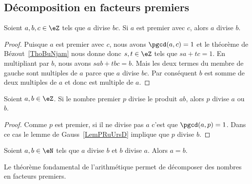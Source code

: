 \subsection{Décomposition en facteurs premiers}

\begin{lemma}    \label{LemPRuUrsD}
	Soient \( a,b,c\in \eZ\) tels que \( a\) divise \( bc\). Si \( a\) est premier avec \( c\), alors \( a\) divise \( b\).
\end{lemma}

\begin{proof}
	Puisque \( a\) est premier avec \( c\), nous avons \( \pgcd(a,c)=1\) et le théorème de Bézout~\ref{ThoBuNjam} nous donne donc \( s,t\in \eZ\) tels que \( sa+tc=1\). En multipliant par \( b\), nous avons \( sab+tbc=b\). Mais les deux termes du membre de gauche sont multiples de \( a\) parce que \( a\) divise \( bc\). Par conséquent \( b\) est somme de deux multiples de \( a\) et donc est multiple de \( a\).
\end{proof}

\begin{lemma}       \label{LemAXINooOeuMJZ}
	Soient \( a,b\in \eZ\). Si le nombre premier \( p\) divise le produit \( ab\), alors \( p\) divise \( a\) ou \( b\).
\end{lemma}

\begin{proof}
	Comme \( p\) est premier, si il ne divise pas \( a\) c'est que \( \pgcd(a,p)=1\). Dans ce cas le lemme de Gauss~\ref{LemPRuUrsD} implique que \( p\) divise \( b\).
\end{proof}

\begin{lemma}		\label{LEMooSRFMooHgEMwj}
	Soient \( a,b\in \eN\) tels que \( a\) divise \( b\) et \( b\) divise \( a\). Alors \( a=b\).
\end{lemma}

Le théorème fondamental de l'arithmétique permet de décomposer des nombres en facteurs premiers.

